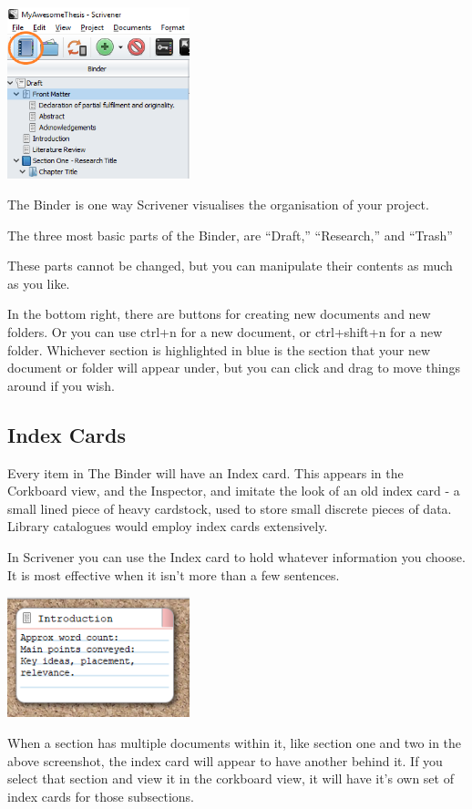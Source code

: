 \documentclass{article}
\begin{document}
\includegraphics[width=200px]{images/scriv005.PNG}

The Binder is one way Scrivener visualises the organisation of your project. 

The three most basic parts of the Binder, are ``Draft,'' ``Research,'' and ``Trash''

These parts cannot be changed, but you can manipulate their contents as much as you like. 

In the bottom right, there are buttons for creating new documents and new folders. Or you can use ctrl+n for a new document, or ctrl+shift+n for a new folder. Whichever section is highlighted in blue is the section that your new document or folder will appear under, but you can click and drag to move things around if you wish. 

\subsection{Index Cards}

Every item in The Binder will have an Index card. This appears in the Corkboard view, and the Inspector, and imitate the look of an old index card - a small lined piece of heavy cardstock, used to store small discrete pieces of data. Library catalogues would employ index cards extensively.

In Scrivener you can use the Index card to hold whatever information you choose. It is most effective when it isn't more than a  few sentences.

\includegraphics[width=200px]{images/scriv008.PNG}

When a section has multiple documents within it, like section one and two in the above screenshot, the index card will appear to have another behind it. If you select that section and view it in the corkboard view, it will have it's own set of index cards for those subsections. 
\end{document}
